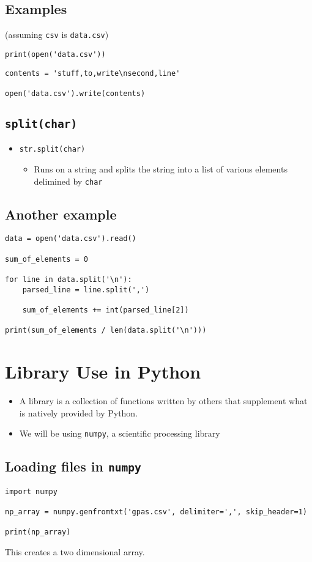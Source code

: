 \documentclass[11pt]{article}
\begin{document}
\subsection{Examples}
\label{sec:org24c611b}
(assuming \texttt{csv} is \texttt{data.csv})
\begin{verbatim}
print(open('data.csv'))
\end{verbatim}

\begin{verbatim}
contents = 'stuff,to,write\nsecond,line'

open('data.csv').write(contents)
\end{verbatim}
\subsection{\texttt{split(char)}}
\label{sec:orga94bcff}
\begin{itemize}
\item \texttt{str.split(char)}
\begin{itemize}
\item Runs on a string and splits the string into a list of various elements delimined by \texttt{char}
\end{itemize}
\end{itemize}
\subsection{Another example}
\label{sec:orgbf56ffa}
\begin{verbatim}
data = open('data.csv').read()

sum_of_elements = 0

for line in data.split('\n'):
    parsed_line = line.split(',')

    sum_of_elements += int(parsed_line[2])

print(sum_of_elements / len(data.split('\n')))
\end{verbatim}
\section{Library Use in Python}
\label{sec:orgb4b8c9a}
\begin{itemize}
\item A library is a collection of functions written by others that supplement what is natively provided by Python.
\item We will be using \texttt{numpy}, a scientific processing library
\end{itemize}
\subsection{Loading files in \texttt{numpy}}
\label{sec:orgb382ddb}
\begin{verbatim}
import numpy

np_array = numpy.genfromtxt('gpas.csv', delimiter=',', skip_header=1)

print(np_array)
\end{verbatim}
This creates a two dimensional array.
\end{document}
